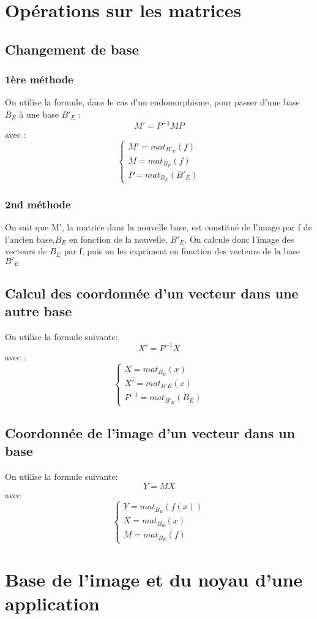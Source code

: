 \section{Opérations sur les matrices}
\subsection{Changement de base}
\subsubsection{1ère méthode}
On utilise la formule, dans le cas d'un endomorphisme, pour passer d'une base $B_E$ à une base $B'_E$ :
$$M' = P^{-1}MP$$
avec :
  \[\left\{\begin{array}{l}
   M'=mat_{B'_E}(f)\\
   M=mat_{B_E}(f)\\
   P=mat_{B_E}(B'_E)
  \end{array}\right.
\]
\subsubsection{2nd méthode}
On sait que M', la matrice dans la nouvelle base, est constitué de l'image par f de l'ancien base,$B_E$ en fonction de la nouvelle, $B'_E$. On calcule donc l'image des vecteurs de $B_E$ par f, puis on les expriment en fonction des vecteurs de la base $B'_E$
\subsection{Calcul des coordonnée d'un vecteur dans une autre base}
On utilise la formule suivante: 
$$X'=P^{-1}X$$
avec :
  \[\left\{\begin{array}{l}
   X = mat_{B_E}(x)\\
   X' = mat_{B'E}(x)\\
   P^{-1} = mat_{B'_E}(B_E)
  \end{array}\right.
\]
\subsection{Coordonnée de l'image d'un vecteur dans un base}
On utilise la formule suivante:
$$Y=MX$$
avec 
  \[\left\{\begin{array}{l}
   Y = mat_{B_E}(f(x))\\
   X = mat_{B_E}(x)\\
   M = mat_{B_E}(f)
  \end{array}\right.
\]
\section{Base de l'image et du noyau d'une application}
